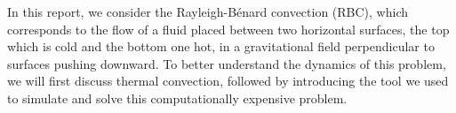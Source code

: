 In this report, we consider the Rayleigh-Bénard convection (RBC), which corresponds to the flow of a fluid placed between two horizontal surfaces, the top which is cold and the bottom one hot, in a gravitational field perpendicular to surfaces pushing downward. To better understand the dynamics of this problem, we will first discuss thermal convection, followed by introducing the tool we used to simulate and solve this computationally expensive problem.